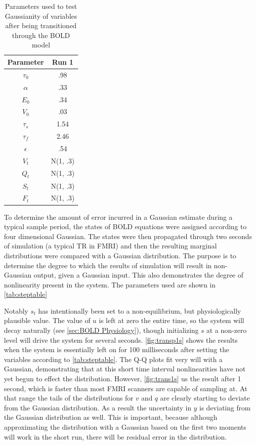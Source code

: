 \begin{table}[t]
\centering
\begin{tabular}{|c || c |}
\hline 
Parameter & Run 1 \\
\hline
$\tau_0$ & .98  \\
$\alpha$ & .33 \\
$E_0$ & .34  \\
$V_0$ & .03  \\
$\tau_s$ & 1.54  \\
$\tau_f$ & 2.46  \\
$\epsilon$ & .54  \\
$V_t$ & N(1, .3)  \\
$Q_t$ & N(1, .3)  \\
$S_t$ & N(1, .3) \\
$F_t$ & N(1, .3) \\
\hline
\end{tabular}
\caption{Parameters used to test Gaussianity of variables after being transitioned through
the BOLD model}
\label{tab:steptable} 
\end{table}

To determine the amount of error incurred in a Gaussian estimate during
a typical sample period, the states of BOLD equations were assigned according
to four dimensional Gaussian. The states were then propagated through two
seconds of simulation (a typical TR in FMRI) and then the resulting
marginal distributions were compared with a Gaussian distribution. The 
purpose is to determine the degree to which the results of simulation will
result in non-Gaussian output, given a Gaussian input. This also demonstrates
the degree of nonlinearity present in the system. The parameters used are 
shown in \autoref{tab:steptable}

Notably $s_t$ has intentionally been set to a non-equilibrium, but physiologically
plausible value. The value of $u$ is left at zero the entire time, so the 
system will decay naturally (see \autoref{sec:BOLD Physiology}), though initializing 
$s$ at a non-zero level will drive the system for several seconds. 
\autoref{fig:transp1s} shows the results when the system is essentially
left on for 100 milliseconds after setting the variables according to \autoref{tab:steptable}.
The Q-Q plots fit very will with a Gaussian, demonstrating that at this short
time interval nonlinearities have not yet begun to effect the distribution.
However, \autoref{fig:trans1s} us the result after 1 second, which is faster
than most FMRI scanners are capable of sampling at. At that range the tails 
of the distributions for $v$ and $q$ are clearly starting to deviate from the
Gaussian distribution. As a result the uncertainty in $y$ is deviating from
the Gaussian distribution as well. This is important, because although 
approximating the distribution with a Gaussian based on the first two
moments will work in the short run, there will be residual error in the
distribution. 

